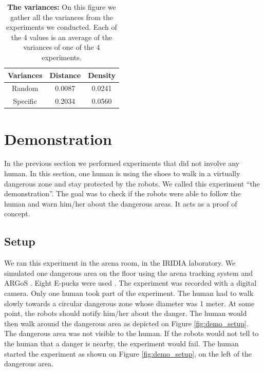 \documentclass[oneside, a4paper, 12pt]{memoir}
\let\oldCaption\caption
\renewcommand{\caption}[2]{
\oldCaption[#1]{{\small\sffamily\bfseries #1:} #2}
}
\begin{document}
				
				\begin{table}[!htp]\centering
					\begin{tabular}{|c|c|c|}
					\hline 
					Variances & Distance & Density \\ 
					\hline 
					Random & 0.0087 & 0.0241 \\ 
					\hline 
					Specific & 0.2034 & 0.0560 \\ 
					\hline 
					\end{tabular}
					\caption{The variances}{On this figure we gather all the variances from the experiments we conducted. Each of the 4 values is an average of the variances of one of the 4 experiments.}
					\label{tab:variances}
				\end{table}
			
	\section{Demonstration}
		\label{sec:demonstration}

		In the previous section we performed experiments that did not involve any human. In this section, one human is using the shoes to walk in a virtually dangerous zone and stay protected by the robots. We called this experiment \enquote{the demonstration}. The goal was to check if the robots were able to follow the human and warn him/her about the dangerous areas. It acts as a proof of concept.
		
		\subsection{Setup}
		
			We ran this experiment in the arena room, in the IRIDIA laboratory. We simulated one dangerous area on the floor using the arena tracking system \citep{stranieri2013iridia,reinaaugmented} and ARGoS \citep{pinciroli2012argos,GarFraBruPinBir2015:techreport-004}. Eight E-pucks were used \citep{mondada2009puck}. The experiment was recorded with a digital camera. Only one human took part of the experiment. The human had to walk slowly towards a circular dangerous zone whose diameter was 1 meter. At some point, the robots should notify him/her about the danger. The human would then walk around the dangerous area as depicted on Figure \ref{fig:demo_setup}. The dangerous area was not visible to the human. If the robots would not tell to the human that a danger is nearby, the experiment would fail. The human started the experiment as shown on Figure \ref{fig:demo_setup}, on the left of the dangerous area.
			
\end{document}
